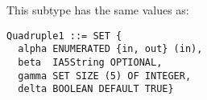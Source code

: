 \documentclass[12pt]{article}
\begin{document}
\begin{slide}
\begin{itemize}
\pagebreak

\noindent
This subtype has the same values as:
\begin{verbatim}
Quadruple1 ::= SET {
  alpha ENUMERATED {in, out} (in),
  beta  IA5String OPTIONAL,
  gamma SET SIZE (5) OF INTEGER,
  delta BOOLEAN DEFAULT TRUE}
\end{verbatim}


\end{itemize}

\end{slide}
\end{document}
